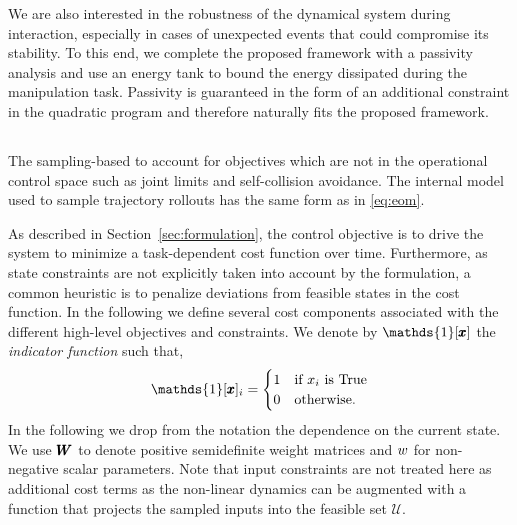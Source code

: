 We are also interested in the robustness of the dynamical system during interaction, especially in cases of unexpected events that could compromise its stability. To this end, we complete the proposed framework with a passivity analysis and use an energy tank to bound the energy dissipated during the manipulation task. Passivity is guaranteed in the form of an additional constraint in the quadratic program and therefore naturally fits the proposed framework.


\subsection{}
The sampling-based  to account for objectives which are not in the operational control space such as joint limits and self-collision avoidance. The internal model used to sample trajectory rollouts has the same form as in \eqref{eq:eom}.

As described in Section~\ref{sec:formulation}, the control objective is to drive the system to minimize a task-dependent cost function over time. Furthermore, as state constraints are not explicitly taken into account by the formulation, a common heuristic is to penalize deviations from feasible states in the cost function. In the following we define several cost components associated with the different high-level objectives and constraints.
We denote by $\mathds{1}[\vect{x}]$ the \textit{indicator function} such that,
\begin{equation}
    \mathds{1}[\vect{x}]_i = 
    \begin{cases}
    1 & \text{if } x_i \text{ is True} \\
    0 & \text{otherwise}.
    \end{cases}
\end{equation}
In the following we drop from the notation the dependence on the current state. We use $\pmb{W}_{}$ to denote positive semidefinite weight matrices and $w_{}$ for non-negative scalar parameters. Note that input constraints are not treated here as additional cost terms as the non-linear dynamics can be augmented with a function that projects the sampled inputs into the feasible set $\mathcal{U}$.

